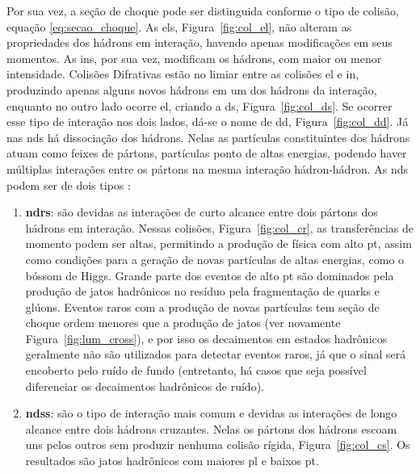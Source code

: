 Por sua vez, a seção de choque pode ser distinguida conforme o tipo de colisão,
equação \ref{eq:secao_choque}. As \glspl{el}, Figura~\ref{fig:col_el},
não alteram as propriedades dos hádrons em interação, havendo apenas 
modificações em seus momentos. As
\glspl{in}, por sua vez, modificam os hádrons, com maior ou menor intensidade. 
Colisões Difrativas estão no limiar entre as colisões \gls{el} e \acrshort{in},
produzindo apenas alguns novos hádrons em um dos hádrons da interação, enquanto no outro
lado ocorre \gls{el}, criando a \gls{ds}, Figura~\ref{fig:col_ds}. 
Se ocorrer esse tipo de interação nos dois lados, dá-se o nome de \gls{dd},
Figura~\ref{fig:col_dd}. Já nas \glspl{nd}
há dissociação dos hádrons. Nelas as partículas constituintes dos
hádrons atuam como feixes de pártons, partículas ponto de altas energias, podendo haver
múltiplas interações entre os pártons na mesma interação hádron-hádron. 
As \glspl{nd} podem ser de dois tipos \cite{THESIS_LAR,Underlying}:
\begin{enumerate}
\item \textbf{\glspl{ndr}}:
são devidas as interações de curto alcance entre dois pártons dos hádrons em
interação. Nessas colisões, Figura~\ref{fig:col_cr}, as transferências de momento podem ser altas,
permitindo a produção de física com alto \gls{pt}, 
assim como condições para a geração de novas partículas de altas
energias, como o bóssom de Higgs. Grande parte dos eventos de alto \gls{pt} são
dominados pela produção de jatos hadrônicos no resíduo pela fragmentação de
quarks e glúons. Eventos raros com a produção de novas partículas tem seção de
choque ordem menores que a produção de jatos (ver novamente
Figura~\ref{fig:lum_cross}), e por isso os decaimentos em
estados hadrônicos geralmente não são utilizados para detectar eventos
raros, já que o sinal será encoberto pelo ruído de fundo (entretanto, há casos
que seja possível diferenciar os decaimentos hadrônicos de ruído). 
\item \textbf{\glspl{nds}}: 
são o tipo de interação mais comum e devidas as interações de longo alcance entre
dois hádrons cruzantes. Nelas os pártons dos hádrons escoam uns pelos outros sem produzir
nenhuma colisão rígida, Figura~\ref{fig:col_cs}. Os resultados são jatos
hadrônicos com maiores \gls{pl} e baixos \gls{pt}.
\end{enumerate}


